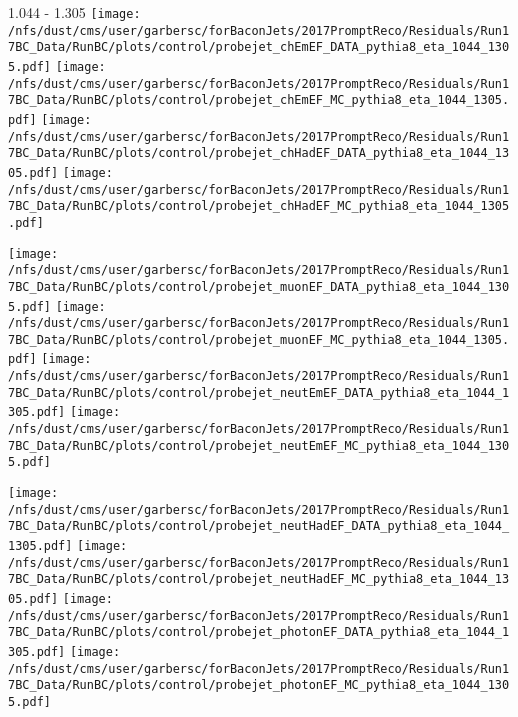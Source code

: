 \documentclass[t,compress]{beamer}
\begin{document}
\begin{frame}{1.044 - 1.305}
	\texttt{[image: /nfs/dust/cms/user/garbersc/forBaconJets/2017PromptReco/Residuals/Run17BC\_Data/RunBC/plots/control/probejet\_chEmEF\_DATA\_pythia8\_eta\_1044\_1305.pdf]}
	\texttt{[image: /nfs/dust/cms/user/garbersc/forBaconJets/2017PromptReco/Residuals/Run17BC\_Data/RunBC/plots/control/probejet\_chEmEF\_MC\_pythia8\_eta\_1044\_1305.pdf]}
	\texttt{[image: /nfs/dust/cms/user/garbersc/forBaconJets/2017PromptReco/Residuals/Run17BC\_Data/RunBC/plots/control/probejet\_chHadEF\_DATA\_pythia8\_eta\_1044\_1305.pdf]}
	\texttt{[image: /nfs/dust/cms/user/garbersc/forBaconJets/2017PromptReco/Residuals/Run17BC\_Data/RunBC/plots/control/probejet\_chHadEF\_MC\_pythia8\_eta\_1044\_1305.pdf]}
\newline

\vspace{-0.65cm}
	\texttt{[image: /nfs/dust/cms/user/garbersc/forBaconJets/2017PromptReco/Residuals/Run17BC\_Data/RunBC/plots/control/probejet\_muonEF\_DATA\_pythia8\_eta\_1044\_1305.pdf]}
	\texttt{[image: /nfs/dust/cms/user/garbersc/forBaconJets/2017PromptReco/Residuals/Run17BC\_Data/RunBC/plots/control/probejet\_muonEF\_MC\_pythia8\_eta\_1044\_1305.pdf]}
	\texttt{[image: /nfs/dust/cms/user/garbersc/forBaconJets/2017PromptReco/Residuals/Run17BC\_Data/RunBC/plots/control/probejet\_neutEmEF\_DATA\_pythia8\_eta\_1044\_1305.pdf]}
	\texttt{[image: /nfs/dust/cms/user/garbersc/forBaconJets/2017PromptReco/Residuals/Run17BC\_Data/RunBC/plots/control/probejet\_neutEmEF\_MC\_pythia8\_eta\_1044\_1305.pdf]}
\newline

\vspace{-0.65cm}
	\texttt{[image: /nfs/dust/cms/user/garbersc/forBaconJets/2017PromptReco/Residuals/Run17BC\_Data/RunBC/plots/control/probejet\_neutHadEF\_DATA\_pythia8\_eta\_1044\_1305.pdf]}
	\texttt{[image: /nfs/dust/cms/user/garbersc/forBaconJets/2017PromptReco/Residuals/Run17BC\_Data/RunBC/plots/control/probejet\_neutHadEF\_MC\_pythia8\_eta\_1044\_1305.pdf]}
	\texttt{[image: /nfs/dust/cms/user/garbersc/forBaconJets/2017PromptReco/Residuals/Run17BC\_Data/RunBC/plots/control/probejet\_photonEF\_DATA\_pythia8\_eta\_1044\_1305.pdf]}
	\texttt{[image: /nfs/dust/cms/user/garbersc/forBaconJets/2017PromptReco/Residuals/Run17BC\_Data/RunBC/plots/control/probejet\_photonEF\_MC\_pythia8\_eta\_1044\_1305.pdf]}
\end{frame}
\end{document}
